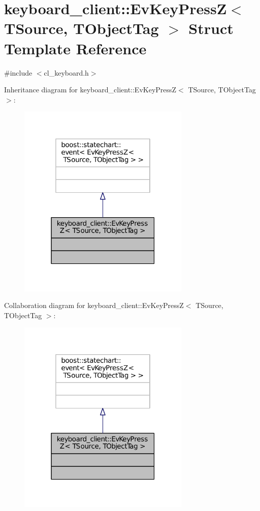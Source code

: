 \hypertarget{structkeyboard__client_1_1EvKeyPressZ}{}\section{keyboard\+\_\+client\+:\+:Ev\+Key\+PressZ$<$ T\+Source, T\+Object\+Tag $>$ Struct Template Reference}
\label{structkeyboard__client_1_1EvKeyPressZ}


{\ttfamily \#include $<$cl\+\_\+keyboard.\+h$>$}



Inheritance diagram for keyboard\+\_\+client\+:\+:Ev\+Key\+PressZ$<$ T\+Source, T\+Object\+Tag $>$\+:
\nopagebreak
\begin{figure}[H]
\begin{center}
\leavevmode
\includegraphics[width=232pt]{structkeyboard__client_1_1EvKeyPressZ__inherit__graph}
\end{center}
\end{figure}


Collaboration diagram for keyboard\+\_\+client\+:\+:Ev\+Key\+PressZ$<$ T\+Source, T\+Object\+Tag $>$\+:
\nopagebreak
\begin{figure}[H]
\begin{center}
\leavevmode
\includegraphics[width=232pt]{structkeyboard__client_1_1EvKeyPressZ__coll__graph}
\end{center}
\end{figure}


